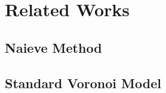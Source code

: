 \section{Related Works}\label{rel}
\subsection{Naieve Method}\label{rel:sec:nm}
\subsection{Standard Voronoi Model}\label{rel:sec:svm}
